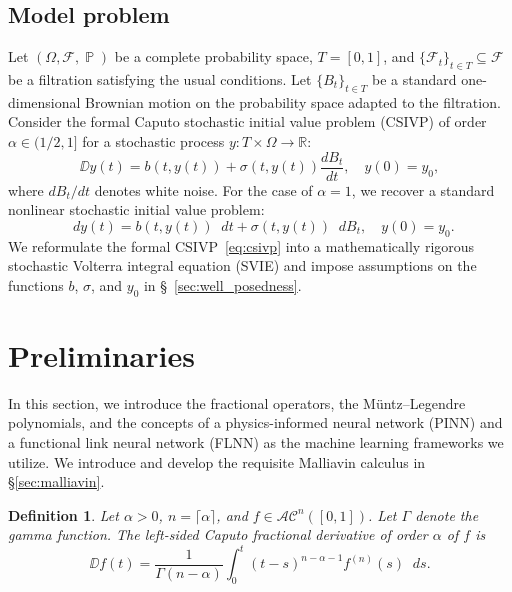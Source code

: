 \documentclass[11pt, a4paper]{article}
\theoremstyle{theoremstyle}
\theoremstyle{definitionstyle}
\newtheorem{definition}[theorem]{Definition}
\newcommand{\dd}{\mathop{}\!d}
\DeclareMathOperator{\PP}{\mathbb P}
\newcommand{\sdv}{\frac{dB_t}{dt}}
\begin{document}
\subsection{Model problem}\label{sec:model_problem}
Let $(\Omega, \mathcal F, \PP)$ be a complete probability space, $T = [0, 1]$, and $\{\mathcal F_t\}_{t \in T} \subseteq \mathcal F$ be a filtration satisfying the usual conditions. Let $\{B_t\}_{t \in T}$ be a standard one-dimensional Brownian motion on the probability space adapted to the filtration. Consider the formal Caputo stochastic initial value problem (CSIVP) of order $\alpha \in (1/2, 1]$ for a stochastic process $y : T \times \Omega \to \mathbb R$:
\begin{equation}\label{eq:csivp}
    \DD y(t) = b(t, y(t)) + \sigma(t, y(t))\sdv, \quad y(0) = y_0,
\end{equation}
where $dB_t/dt$ denotes white noise. For the case of $\alpha = 1$, we recover a standard nonlinear stochastic initial value problem:
\begin{equation}
    \dd{y(t)} = b(t, y(t))\dd{t} + \sigma(t, y(t))\dd{B_t}, \quad y(0) = y_0.
\end{equation}
We reformulate the formal CSIVP~\eqref{eq:csivp} into a mathematically rigorous stochastic Volterra integral equation (SVIE) and impose assumptions on the functions $b$, $\sigma$, and $y_0$ in \S~\ref{sec:well_posedness}.

\section{Preliminaries}\label{sec:preliminaries}
In this section, we introduce the fractional operators, the M\"untz--Legendre polynomials, and the concepts of a physics-informed neural network (PINN) and a functional link neural network (FLNN) as the machine learning frameworks we utilize. We introduce and develop the requisite Malliavin calculus in \S\ref{sec:malliavin}.

\begin{definition}\label{def:caputo}
    Let $\alpha > 0$, $n = \lceil \alpha \rceil$, and $f \in \mathcal{AC}^n([0, 1])$. Let $\Gamma$ denote the gamma function. The \emph{left-sided Caputo fractional derivative} of order $\alpha$ of $f$ is
    \begin{equation}
        \DD f(t) = \frac{1}{\Gamma(n - \alpha)} \int_0^t (t - s)^{n - \alpha - 1}f^{(n)}(s)\dd{s}.
    \end{equation} 
\end{definition}
\end{document}
